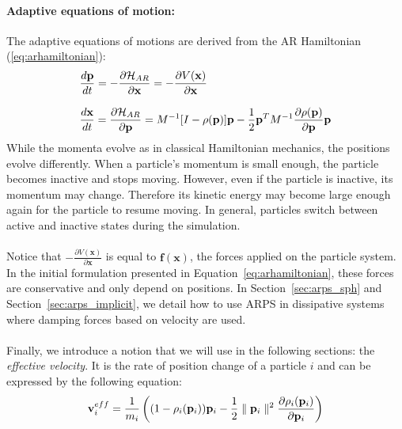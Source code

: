 \paragraph*{Adaptive equations of motion:}
The adaptive equations of motions are derived from the AR Hamiltonian (\ref{eq:arhamiltonian}):
\begin{equation}
   \label{eq:armotionequation}
    \displaystyle
    \begin{array}{l}
        \displaystyle \frac{d\mathbf{p}}{dt} =
        -\frac{\partial \mathcal{H}_{AR}}{\partial \mathbf{x}} = -\frac{\partial V(\mathbf{x})}{\partial \mathbf{x}}\\ \\
        \displaystyle \frac{d\mathbf{x}}{dt} =
       \frac{\partial \mathcal{H}_{AR}}{\partial \mathbf{p}} = M^{-1}[I - \rho(\mathbf{p})] \mathbf{p}
        - \frac{1}{2}\mathbf{p}^{T}M^{-1}\frac{\partial \rho(\mathbf{p})}{\partial \mathbf{p}}\mathbf{p}\\
    \end{array}
\end{equation}
While the momenta evolve as in classical Hamiltonian mechanics, the positions evolve differently.
When a particle's momentum is small enough, the particle becomes inactive and stops moving.
However, even if the particle is inactive, its momentum may change.
Therefore its kinetic energy may become large enough again for the particle to resume moving.
In general, particles switch between active and inactive states during the simulation.
\\ \\
Notice that $\displaystyle -\frac{\partial V(\mathbf{x})}{\partial \mathbf{x}}$ is equal to $\mathbf{f}(\mathbf{x})$, the forces applied on the particle system. In the initial formulation presented in Equation~\ref{eq:arhamiltonian}, these forces are conservative and only depend on positions. In Section~\ref{sec:arps_sph} and Section~\ref{sec:arps_implicit}, we detail how to use ARPS in dissipative systems where damping forces based on velocity are used.
\\ \\
Finally, we introduce a notion that we will use in the following sections: the \textit{effective velocity}. It is the rate of position change of a particle $i$ and can be expressed by the following equation:
\begin{equation}
    \label{eq:adaptiveVelocity}
    \mathbf{v}_{i}^{eff} = \frac{1}{m_{i}} \left( (1-\rho_{i}(\mathbf{p}_{i}))\mathbf{p}_{i} - \frac{1}{2} \parallel \mathbf{p}_{i} \parallel^2 \frac{\partial \rho_{i}(\mathbf{p}_{i})}{\partial \mathbf{p}_{i}}\right)
\end{equation}
